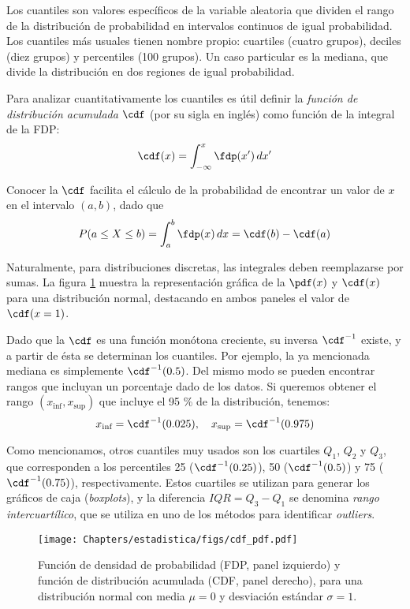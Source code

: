 Los cuantiles son valores específicos de la variable aleatoria que dividen el rango de la distribución de probabilidad en intervalos continuos de igual probabilidad. Los cuantiles más usuales tienen nombre propio: cuartiles (cuatro grupos), deciles (diez grupos) y percentiles (100 grupos). Un caso particular es la mediana, que divide la distribución en dos regiones de igual probabilidad.

Para analizar cuantitativamente los cuantiles es útil definir la \textit{función de distribución acumulada} $\cdf$ (por su sigla en inglés) como función de la integral de la FDP:
\begin{equation}
 \cdf(x) = \int_{-\infty}^x \fdp(x') \, dx'
\end{equation} 

Conocer la $\cdf$ facilita el cálculo de la probabilidad de encontrar un valor de $x$ en el intervalo $(a, b)$, dado que
\[ P(a \leq X \leq b) = \int_a^b \fdp(x) \, dx = \cdf(b) - \cdf(a) \]

Naturalmente, para distribuciones discretas, las integrales deben reemplazarse por sumas. La figura \ref{fig:estad02} muestra la representación gráfica de la $\pdf(x)$ y $\cdf(x)$ para una distribución normal, destacando en ambos paneles el valor de $\cdf(x = 1)$.

Dado que la $\cdf$ es una función monótona creciente, su inversa $\cdf^{-1}$ existe, y a partir de ésta se determinan los cuantiles. Por ejemplo, la ya mencionada mediana es simplemente $\cdf^{-1}(0.5)$. Del mismo modo se pueden encontrar rangos que incluyan un porcentaje dado de los datos. Si queremos obtener el rango $(x_{\text{inf}}, x_{\text{sup}})$ que incluye el 95 \% de la distribución, tenemos:
\[ x_{\text{inf}} = \cdf^{-1}(0.025), \quad x_{\text{sup}} = \cdf^{-1}(0.975) \]

Como mencionamos, otros cuantiles muy usados son los cuartiles $Q_1$, $Q_2$ y $Q_3$, que corresponden a los percentiles 25 ($\cdf^{-1}(0.25)$), 50 ($\cdf^{-1}(0.5)$) y 75 ($\cdf^{-1}(0.75)$), respectivamente. Estos cuartiles se utilizan para generar los gráficos de caja (\textit{boxplots}), y la diferencia $IQR = Q_3 - Q_1$ se denomina \textit{rango intercuartílico}, que se utiliza en uno de los métodos para identificar \textit{outliers}.


\begin{figure}[t]
 \centering
 \texttt{[image: Chapters/estadistica/figs/cdf\_pdf.pdf]}
 \caption{Función de densidad de probabilidad (FDP, panel izquierdo) y función de distribución acumulada (CDF, panel derecho), para una distribución normal con media $\mu = 0$ y desviación estándar $\sigma = 1$.}
 \label{fig:estad02}
\end{figure}


